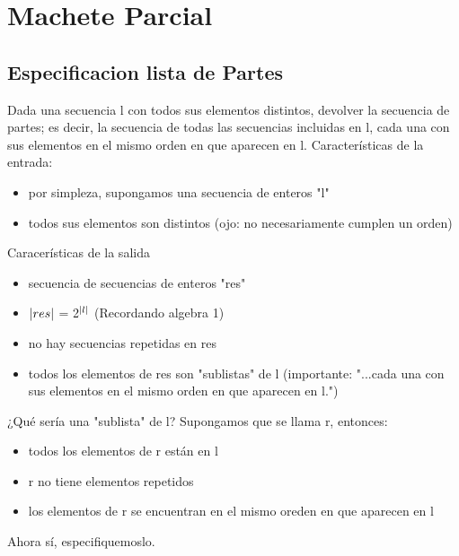 \documentclass{article}
\begin{document}
\section{Machete Parcial}

\subsection{Especificacion lista de Partes}
Dada una secuencia l con todos sus elementos distintos, devolver la secuencia de partes; es decir, la secuencia de todas las secuencias incluidas en l, cada una con sus elementos en el mismo orden en que aparecen en l.
Características de la entrada:
\begin{itemize}
    \item por simpleza, supongamos una secuencia de enteros "l"
    \item todos sus elementos son distintos (ojo: no necesariamente cumplen un orden)
\end{itemize}
Caracerísticas de la salida
\begin{itemize}
    \item secuencia de secuencias de enteros "res"
    \item $|res|$ = 2$^{|l|}$ (Recordando algebra 1)
    \item no hay secuencias repetidas en res
    \item todos los elementos de res son "sublistas" de l 
        (importante: "...cada una con sus elementos en el mismo orden en que aparecen en l.")
\end{itemize}
¿Qué sería una "sublista" de l?
Supongamos que se llama r, entonces:
\begin{itemize}
    \item  todos los elementos de r están en l
    \item  r no tiene elementos repetidos
    \item  los elementos de r se encuentran en el mismo oreden en que aparecen en l
\end{itemize}
Ahora sí, especifiquemoslo.
\end{document}
